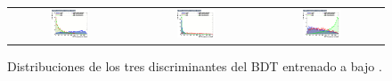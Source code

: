 \begin{figure}[htbp]
  \centering
  \setlength{\tabcolsep}{1.5pt}
  \renewcommand{\arraystretch}{0}
  \begin{tabular}{@{}c c c@{}}
    \includegraphics[width=0.33\textwidth]{images/plots_overtrain_lt200/overtrain_Signal_BDTG.png} &
    \includegraphics[width=0.33\textwidth]{images/plots_overtrain_lt200/overtrain_bkgZ_BDTG.png} &  
    \includegraphics[width=0.33\textwidth]{images/plots_overtrain_lt200/overtrain_bkgtt_BDTG.png}
  \end{tabular}
  \caption{Distribuciones de los tres discriminantes del BDT entrenado a bajo \pth.}
  \label{res:lowpt_scores}
\end{figure}


